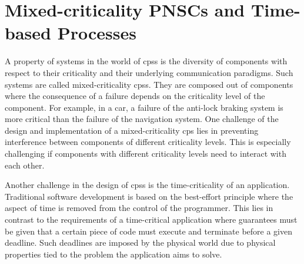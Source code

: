 %
\chapter{Mixed-criticality PNSCs and Time-based Processes}
\label{chap_tcm}
A property of systems in the world of \glspl{cps} is the diversity of components with respect to their criticality and their underlying communication paradigms.
Such systems are called mixed-criticality \glspl{cps}.
They are composed out of components where the consequence of a failure depends on the criticality level of the component.
For example, in a car, a failure of the anti-lock braking system is more critical than the failure of the navigation system.
One challenge of the design and implementation of a mixed-criticality \gls{cps} lies in preventing interference between components of different criticality levels.
This is especially challenging if components with different criticality levels need to interact with each other.

Another challenge in the design of \glspl{cps} is the time-criticality of an application.
Traditional software development is based on the best-effort principle where the aspect of time is removed from the control of the programmer.
This lies in contrast to the requirements of a time-critical application where guarantees must be given that a certain piece of code must execute and terminate before a given deadline.
Such deadlines are imposed by the physical world due to physical properties tied to the problem the application aims to solve.

